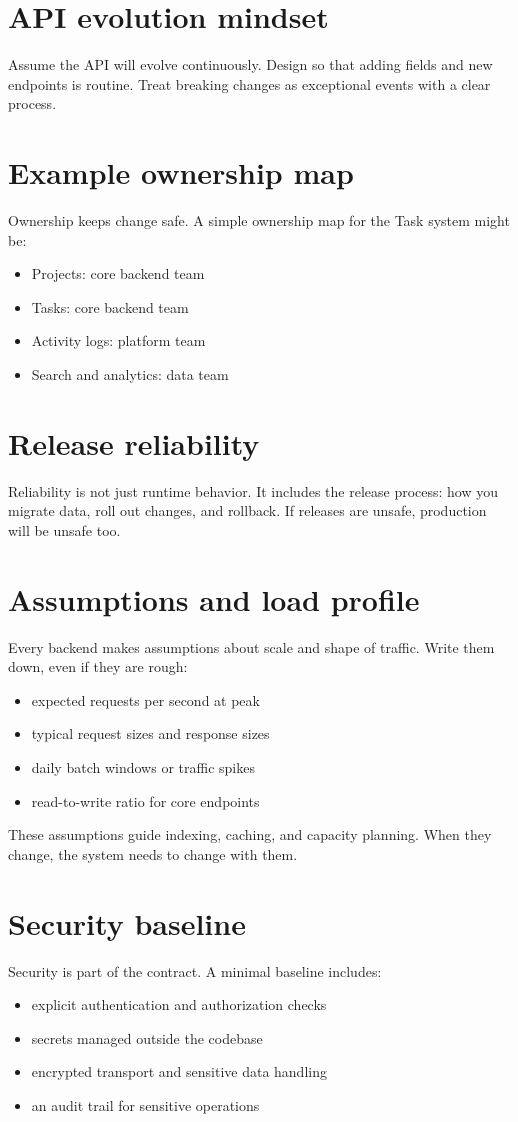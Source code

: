\section{API evolution mindset}
Assume the API will evolve continuously.
Design so that adding fields and new endpoints is routine.
Treat breaking changes as exceptional events with a clear process.

\section{Example ownership map}
Ownership keeps change safe.
A simple ownership map for the Task system might be:
\begin{itemize}[nosep]
  \item Projects: core backend team
  \item Tasks: core backend team
  \item Activity logs: platform team
  \item Search and analytics: data team
\end{itemize}

\section{Release reliability}
Reliability is not just runtime behavior.
It includes the release process: how you migrate data, roll out changes, and rollback.
If releases are unsafe, production will be unsafe too.

\section{Assumptions and load profile}
Every backend makes assumptions about scale and shape of traffic.
Write them down, even if they are rough:
\begin{itemize}[nosep]
  \item expected requests per second at peak
  \item typical request sizes and response sizes
  \item daily batch windows or traffic spikes
  \item read-to-write ratio for core endpoints
\end{itemize}

These assumptions guide indexing, caching, and capacity planning.
When they change, the system needs to change with them.

\section{Security baseline}
Security is part of the contract.
A minimal baseline includes:
\begin{itemize}[nosep]
  \item explicit authentication and authorization checks
  \item secrets managed outside the codebase
  \item encrypted transport and sensitive data handling
  \item an audit trail for sensitive operations
\end{itemize}

